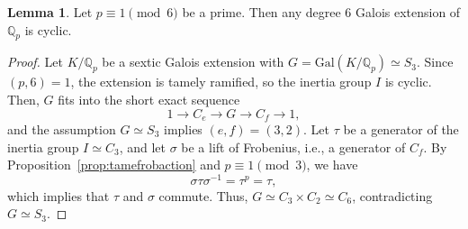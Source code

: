\documentclass[letterpaper, 10pt]{article}
\newcommand{\Gal}{\mathrm{Gal}}
\newcommand{\bQ}{\mathbb{Q}}
\newcommand{\1}{\mathds{1}}	%
\theoremstyle{definition}
\newtheorem{lemma}[theorem]{Lemma}
\theoremstyle{remark}
\begin{document}
\begin{lemma}
    \label{lem:p16_cyclic}
    Let $p \equiv 1 \pmod{6}$ be a prime. Then any degree 6 Galois extension of $\bQ_p$ is cyclic.
\end{lemma}
\begin{proof}
    Let \( K / \mathbb{Q}_p \) be a sextic Galois extension with \( G = \Gal(K / \mathbb{Q}_p) \simeq S_3 \).   Since \( (p, 6) = 1 \), the extension is tamely ramified, so the inertia group \( I \) is cyclic.   Then, \( G \) fits into the short exact sequence 
    \begin{equation}
        1 \to C_e \to G \to C_f \to 1, \label{eqn:tameram_exact_seq}
    \end{equation}
    and the assumption \( G \simeq S_3 \) implies \( (e, f) = (3, 2) \). Let \( \tau \) be a generator of the inertia group \( I \simeq C_3 \), and let \( \sigma \) be a lift of Frobenius, i.e., a generator of \( C_f \).   By Proposition~\ref{prop:tamefrobaction} and \( p \equiv 1 \pmod{3} \), we have \[ \sigma \tau \sigma^{-1} = \tau^p = \tau, \] which implies that \( \tau \) and \( \sigma \) commute.   Thus, \( G \simeq C_3 \times C_2 \simeq C_6 \), contradicting  \( G \simeq S_3 \).
\end{proof}
\end{document}
